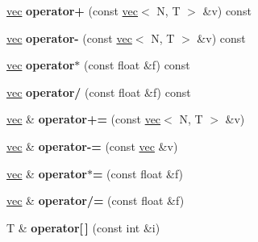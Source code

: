 \begin{DoxyCompactItemize}
\item 
\hypertarget{structj3d_1_1vec_a6901f1812fd0df38a37202ad504c8e0a}{}\hyperlink{structj3d_1_1vec}{vec} {\bfseries operator+} (const \hyperlink{structj3d_1_1vec}{vec}$<$ N, T $>$ \&v) const \label{structj3d_1_1vec_a6901f1812fd0df38a37202ad504c8e0a}

\item 
\hypertarget{structj3d_1_1vec_a076a3214ff109ed918fc9754af94c7f2}{}\hyperlink{structj3d_1_1vec}{vec} {\bfseries operator-\/} (const \hyperlink{structj3d_1_1vec}{vec}$<$ N, T $>$ \&v) const \label{structj3d_1_1vec_a076a3214ff109ed918fc9754af94c7f2}

\item 
\hypertarget{structj3d_1_1vec_a4804892a773b0a38c9e986d10f2dd0ea}{}\hyperlink{structj3d_1_1vec}{vec} {\bfseries operator$\ast$} (const float \&f) const \label{structj3d_1_1vec_a4804892a773b0a38c9e986d10f2dd0ea}

\item 
\hypertarget{structj3d_1_1vec_ab7713ad3db1584d83cdb67f60166e7e7}{}\hyperlink{structj3d_1_1vec}{vec} {\bfseries operator/} (const float \&f) const \label{structj3d_1_1vec_ab7713ad3db1584d83cdb67f60166e7e7}

\item 
\hypertarget{structj3d_1_1vec_a593b76e05d6699bf9481031657c4e372}{}\hyperlink{structj3d_1_1vec}{vec} \& {\bfseries operator+=} (const \hyperlink{structj3d_1_1vec}{vec}$<$ N, T $>$ \&v)\label{structj3d_1_1vec_a593b76e05d6699bf9481031657c4e372}

\item 
\hypertarget{structj3d_1_1vec_af8973322310d69bb3f5a38fe7d991f30}{}\hyperlink{structj3d_1_1vec}{vec} \& {\bfseries operator-\/=} (const \hyperlink{structj3d_1_1vec}{vec} \&v)\label{structj3d_1_1vec_af8973322310d69bb3f5a38fe7d991f30}

\item 
\hypertarget{structj3d_1_1vec_a0a163c46ed478140f8885d962941f456}{}\hyperlink{structj3d_1_1vec}{vec} \& {\bfseries operator$\ast$=} (const float \&f)\label{structj3d_1_1vec_a0a163c46ed478140f8885d962941f456}

\item 
\hypertarget{structj3d_1_1vec_add3621eb883cc192d2ca864b4a03c224}{}\hyperlink{structj3d_1_1vec}{vec} \& {\bfseries operator/=} (const float \&f)\label{structj3d_1_1vec_add3621eb883cc192d2ca864b4a03c224}

\item 
\hypertarget{structj3d_1_1vec_ae29a5e6173666b79c660094959f7de9b}{}T \& {\bfseries operator\mbox{[}$\,$\mbox{]}} (const int \&i)\label{structj3d_1_1vec_ae29a5e6173666b79c660094959f7de9b}


\end{DoxyCompactItemize}
